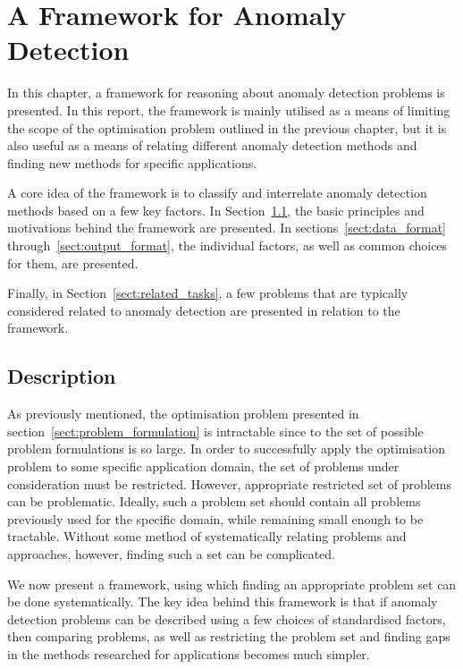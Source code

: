 \chapter{A Framework for Anomaly Detection}
\label{ch:framework}

In this chapter, a framework for reasoning about anomaly detection problems is presented. In this report, the framework is mainly utilised as a means of limiting the scope of the optimisation problem outlined in the previous chapter, but it is also useful as a means of relating different anomaly detection methods and finding new methods for specific applications.

A core idea of the framework is to classify and interrelate anomaly detection methods based on a few key factors. In Section~\ref{sect:the_framework}, the basic principles and motivations behind the framework are presented. In sections~\ref{sect:data_format} through~\ref{sect:output_format}, the individual factors, as well as common choices for them, are presented.

Finally, in Section~\ref{sect:related_tasks}, a few problems that are typically considered related to anomaly detection are presented in relation to the framework.

\section{Description}
\label{sect:the_framework}

As previously mentioned, the optimisation problem presented in section~\ref{sect:problem_formulation} is intractable since to the set of possible problem formulations is so large. In order to successfully apply the optimisation problem to some specific application domain, the set of problems under consideration must be restricted. However, appropriate restricted set of problems can be problematic. Ideally, such a problem set should contain all problems previously used for the specific domain, while remaining small enough to be tractable. Without some method of systematically relating problems and approaches, however, finding such a set can be complicated.

We now present a framework, using which finding an appropriate problem set can be done systematically. The key idea behind this framework is that if anomaly detection problems can be described using a few choices of standardised factors, then comparing problems, as well as restricting the problem set and finding gaps in the methods researched for applications becomes much simpler.

